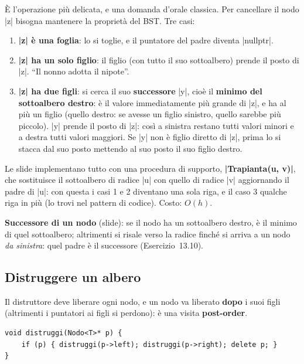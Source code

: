 È l'operazione più delicata, e una domanda d'orale classica. Per cancellare il nodo
\cc|z| bisogna mantenere la proprietà del BST. Tre casi:
\begin{enumerate}
  \item \textbf{\cc|z| è una foglia}: lo si toglie, e il puntatore del padre diventa
        \cc|nullptr|.
  \item \textbf{\cc|z| ha un solo figlio}: il figlio (con tutto il suo sottoalbero) prende
        il posto di \cc|z|. ``Il nonno adotta il nipote''.
  \item \textbf{\cc|z| ha due figli}: si cerca il suo \textbf{successore} \cc|y|, cioè
        il \textbf{minimo del sottoalbero destro}: è il valore immediatamente più grande di
        \cc|z|, e ha al più un figlio (quello destro: se avesse un figlio sinistro, quello
        sarebbe più piccolo). \cc|y| prende il posto di \cc|z|: così a sinistra restano
        tutti valori minori e a destra tutti valori maggiori. Se \cc|y| non è figlio
        diretto di \cc|z|, prima lo si stacca dal suo posto mettendo al suo posto il suo
        figlio destro.
\end{enumerate}
Le slide implementano tutto con una procedura di supporto, \textbf{\cc|Trapianta(u, v)|},
che sostituisce il sottoalbero di radice \cc|u| con quello di radice \cc|v|
aggiornando il padre di \cc|u|: con questa i casi 1 e 2 diventano una sola riga, e il caso
3 qualche riga in più (lo trovi nel pattern di codice). Costo: $O(h)$.

\textbf{Successore di un nodo} (slide): se il nodo ha un sottoalbero destro, è il minimo
di quel sottoalbero; altrimenti si risale verso la radice finché si arriva a un nodo
\emph{da sinistra}: quel padre è il successore (Esercizio~13.10).

\subsection*{Distruggere un albero}

Il distruttore deve liberare ogni nodo, e un nodo va liberato \textbf{dopo} i suoi figli
(altrimenti i puntatori ai figli si perdono): è una visita \textbf{post-order}.
\begin{lstlisting}
void distruggi(Nodo<T>* p) {
    if (p) { distruggi(p->left); distruggi(p->right); delete p; }
}
\end{lstlisting}

